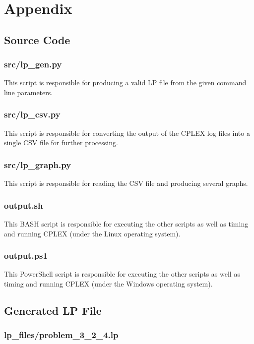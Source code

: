 \documentclass[12pt]{article} %
\begin{document}

\section{Appendix}


\subsection{Source Code}
\label{section:source}

\subsubsection{src/lp\_gen.py}
This script is responsible for producing a valid LP file from the given command line parameters.


\subsubsection{src/lp\_csv.py}
This script is responsible for converting the output of the CPLEX log files into a single CSV file for further processing.


\subsubsection{src/lp\_graph.py}
This script is responsible for reading the CSV file and producing several graphs.


\subsubsection{output.sh}
This BASH script is responsible for executing the other scripts as well as timing and running CPLEX (under the Linux operating system).


\subsubsection{output.ps1}
This PowerShell script is responsible for executing the other scripts as well as timing and running CPLEX (under the Windows operating system).



\subsection{Generated LP File}

\subsubsection{lp\_files/problem\_3\_2\_4.lp}

\end{document}
